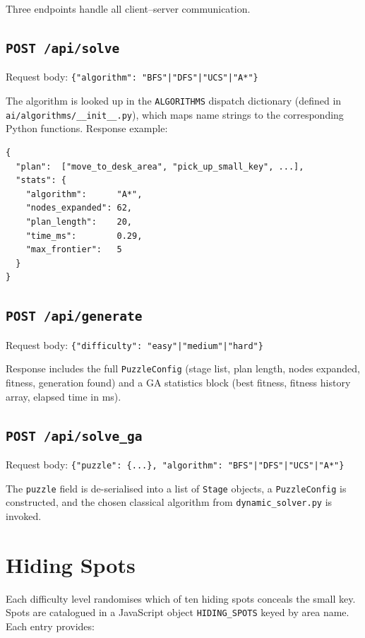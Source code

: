 \documentclass[12pt, a4paper]{report}
\begin{document}
Three endpoints handle all client--server communication.

\subsection{\texttt{POST /api/solve}}

Request body: \texttt{\{"algorithm": "BFS"|"DFS"|"UCS"|"A*"\}}

The algorithm is looked up in the \texttt{ALGORITHMS} dispatch dictionary
(defined in \texttt{ai/algorithms/\_\_init\_\_.py}), which maps name strings
to the corresponding Python functions.  Response example:

\begin{verbatim}
{
  "plan":  ["move_to_desk_area", "pick_up_small_key", ...],
  "stats": {
    "algorithm":      "A*",
    "nodes_expanded": 62,
    "plan_length":    20,
    "time_ms":        0.29,
    "max_frontier":   5
  }
}
\end{verbatim}

\subsection{\texttt{POST /api/generate}}

Request body: \texttt{\{"difficulty": "easy"|"medium"|"hard"\}}

Response includes the full \texttt{PuzzleConfig} (stage list, plan length,
nodes expanded, fitness, generation found) and a GA statistics block (best
fitness, fitness history array, elapsed time in ms).

\subsection{\texttt{POST /api/solve\_ga}}

Request body: \texttt{\{"puzzle": \{...\}, "algorithm": "BFS"|"DFS"|"UCS"|"A*"\}}

The \texttt{puzzle} field is de-serialised into a list of \texttt{Stage}
objects, a \texttt{PuzzleConfig} is constructed, and the chosen classical
algorithm from \texttt{dynamic\_solver.py} is invoked.

\section{Hiding Spots}
\label{sec:hidingspots}

Each difficulty level randomises which of ten hiding spots conceals the small
key.  Spots are catalogued in a JavaScript object \texttt{HIDING\_SPOTS} keyed
by area name.  Each entry provides:
\end{document}
